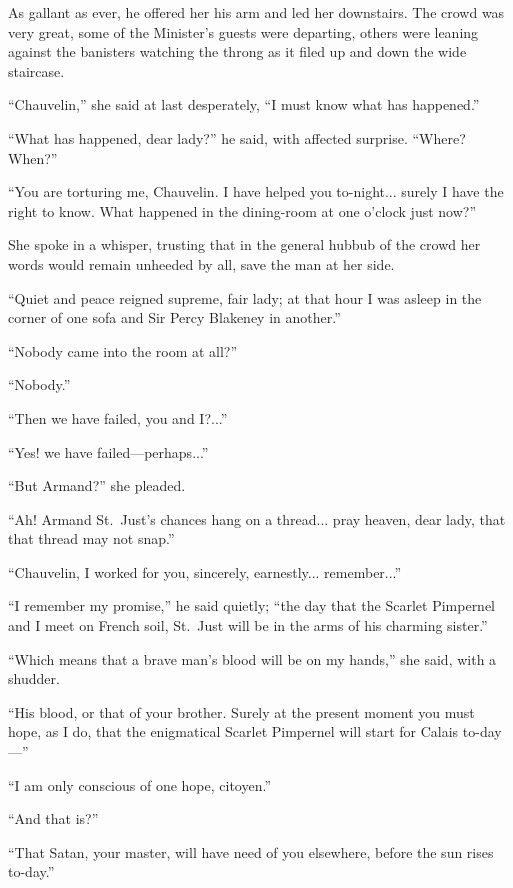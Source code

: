 \documentclass[paper=5.5in:8.5in,BCOR=7mm,twoside,DIV=calc,12pt,usegeometry,chapterprefix,endperiod,headings=big]{scrbook}
\begin{document}
As gallant as ever, he offered her his arm and led her downstairs. The crowd was very great, some of the Minister's guests were departing, others were leaning against the banisters watching the throng as it filed up and down the wide staircase.

\enquote{Chauvelin,} she said at last desperately, \enquote{I must know what has happened.}

\enquote{What has happened, dear lady?} he said, with affected surprise. \enquote{Where? When?}

\enquote{You are torturing me, Chauvelin. I have helped you to-night... surely I have the right to know. What happened in the dining-room at one o'clock just now?}

She spoke in a whisper, trusting that in the general hubbub of the crowd her words would remain unheeded by all, save the man at her side.

\enquote{Quiet and peace reigned supreme, fair lady; at that hour I was asleep in the corner of one sofa and Sir Percy Blakeney in another.}

\enquote{Nobody came into the room at all?}

\enquote{Nobody.}

\enquote{Then we have failed, you and I?...}

\enquote{Yes! we have failed---perhaps...}

\enquote{But Armand?} she pleaded.

\enquote{Ah! Armand St.~Just's chances hang on a thread... pray heaven, dear lady, that that thread may not snap.}

\enquote{Chauvelin, I worked for you, sincerely, earnestly... remember...}

\enquote{I remember my promise,} he said quietly; \enquote{the day that the Scarlet Pimpernel and I meet on French soil, St.~Just will be in the arms of his charming sister.}

\enquote{Which means that a brave man's blood will be on my hands,} she said, with a shudder.

\enquote{His blood, or that of your brother. Surely at the present moment you must hope, as I do, that the enigmatical Scarlet Pimpernel will start for Calais to-day---}

\enquote{I am only conscious of one hope, citoyen.}

\enquote{And that is?}

\enquote{That Satan, your master, will have need of you elsewhere, before the sun rises to-day.}
\end{document}
